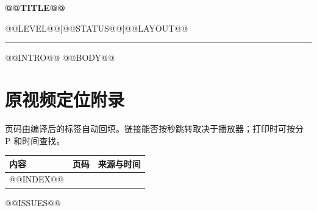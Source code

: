 \documentclass[11pt,a4paper]{article}
\begin{document}
{\LARGE\bfseries @@TITLE@@\par}
\medskip
{\color{ink} @@LEVEL@@\quad{}|\quad{}@@STATUS@@\quad{}|\quad{}@@LAYOUT@@}\par
\medskip\hrule\medskip
@@INTRO@@
@@BODY@@
\clearpage
\section*{原视频定位附录}
{\small 页码由编译后的标签自动回填。链接能否按秒跳转取决于播放器；打印时可按分 P 和时间查找。}
\begin{longtable}{@{}p{}r p{}@{}}
\toprule 内容 & 页码 & 来源与时间\\\midrule\endhead
@@INDEX@@
\bottomrule
\end{longtable}
@@ISSUES@@
\end{document}
